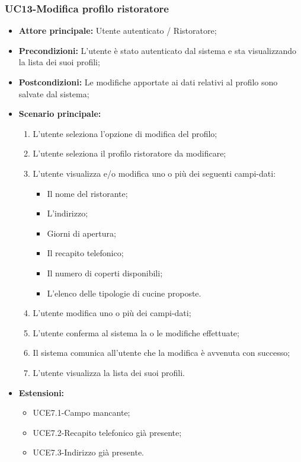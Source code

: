 \subsubsection{UC13-Modifica profilo ristoratore}
\begin{itemize}
\item \textbf{Attore principale:} Utente autenticato / Ristoratore;
\item \textbf{Precondizioni:} L'utente è stato autenticato dal sistema e sta visualizzando la lista dei suoi profili;
\item \textbf{Postcondizioni:} Le modifiche apportate ai dati relativi al profilo sono salvate dal sistema;
\item \textbf{Scenario principale:}
\begin{enumerate}
    \item L'utente seleziona l'opzione di modifica del profilo;
    \item L'utente seleziona il profilo ristoratore da modificare;
    \item L'utente visualizza e/o modifica uno o più dei seguenti campi-dati:
        \begin{itemize}
            \item Il nome del ristorante;
            \item L'indirizzo;
            \item Giorni di apertura;
            \item Il recapito telefonico;
            \item Il numero di coperti disponibili;
            \item L'elenco delle tipologie di cucine proposte.
        \end{itemize}
    \item L'utente modifica uno o più dei campi-dati;
    \item L'utente conferma al sistema la o le modifiche effettuate;
    \item Il sistema comunica all'utente che la modifica è avvenuta con successo;
    \item L'utente visualizza la lista dei suoi profili.
\end{enumerate}
        \item \textbf{Estensioni:}
        \begin{itemize}
                \item UCE7.1-Campo mancante;
                \item UCE7.2-Recapito telefonico già presente;
                \item UCE7.3-Indirizzo già presente.
        \end{itemize}
\end{itemize}

